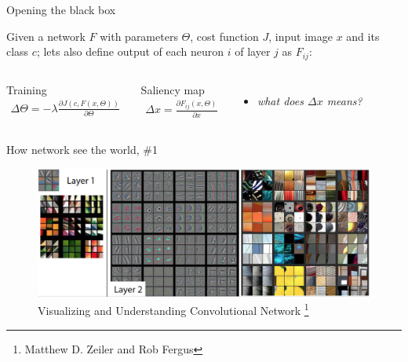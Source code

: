 \documentclass{beamer}
\begin{document}
\begin{frame}{Opening the black box}

Given a network $F$ with parameters $\Theta$, cost function $J$, input image $x$ and its class $c$; lets also define output of each neuron $i$ of layer $j$ as $F_{ij}$:
\begin{columns}[t]
\begin{block}{Training}
\begin{eqnarray*}
\Delta\Theta = -\lambda \frac{\partial J\left(c, F\left(x, \Theta \right)\right)}{\partial \Theta}
\end{eqnarray*}
\end{block}
	
\begin{block}{Saliency map}
\begin{eqnarray*}
\Delta x = \frac{\partial F_{ij}\left(x, \Theta \right)}{\partial x}
\end{eqnarray*}
\end{block}

\begin{itemize}
\item \textit{what does $\Delta x$ means?}
\end{itemize}
	
\end{columns}

\end{frame}


\begin{frame}{How network see the world, \#1}

\begin{figure}[h!]
  \centering
  \includegraphics[width=1\textwidth]{images/features1.png}
  \caption{Visualizing and Understanding Convolutional Network \footnote{Matthew D. Zeiler and Rob Fergus}}
\end{figure}

\end{frame}
\end{document}
